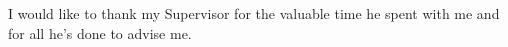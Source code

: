 \documentclass[english,master,unicode,bw]{ctufit-thesis}
\theoremstyle{plain}
\theoremstyle{definition}
\theoremstyle{remark}
\numberwithin{theorem}{chapter}
\begin{document}
\frontmatter\frontmatterinit %


\thispagestyle{empty}\cleardoublepage\maketitle %

\imprintpage %

\tableofcontents %
\listoffigures %
\begingroup
\let\clearpage\relax
\listoftables %
\endgroup

\begin{acknowledgmentpage}
    I would like to thank my Supervisor for the valuable time he spent with me and for all he's done to advise me.
\end{acknowledgmentpage}
\end{document}
